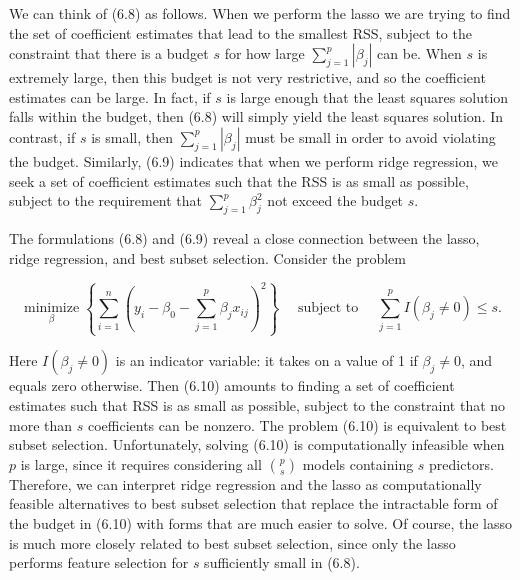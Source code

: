 \documentclass[10pt]{article}
\begin{document}
We can think of (6.8) as follows. When we perform the lasso we are trying to find the set of coefficient estimates that lead to the smallest RSS, subject to the constraint that there is a budget $s$ for how large $\sum_{j=1}^{p}\left|\beta_{j}\right|$ can be. When $s$ is extremely large, then this budget is not very restrictive, and so the coefficient estimates can be large. In fact, if $s$ is large enough that the least squares solution falls within the budget, then (6.8) will simply yield the least squares solution. In contrast, if $s$ is small, then $\sum_{j=1}^{p}\left|\beta_{j}\right|$ must be small in order to avoid violating the budget. Similarly, (6.9) indicates that when we perform ridge regression, we seek a set of coefficient estimates such that the RSS is as small as possible, subject to the requirement that $\sum_{j=1}^{p} \beta_{j}^{2}$ not exceed the budget $s$.

The formulations (6.8) and (6.9) reveal a close connection between the lasso, ridge regression, and best subset selection. Consider the problem


\begin{equation*}
\underset{\beta}{\operatorname{minimize}}\left\{\sum_{i=1}^{n}\left(y_{i}-\beta_{0}-\sum_{j=1}^{p} \beta_{j} x_{i j}\right)^{2}\right\} \quad \text { subject to } \quad \sum_{j=1}^{p} I\left(\beta_{j} \neq 0\right) \leq s . \tag{6.10}
\end{equation*}


Here $I\left(\beta_{j} \neq 0\right)$ is an indicator variable: it takes on a value of 1 if $\beta_{j} \neq 0$, and equals zero otherwise. Then (6.10) amounts to finding a set of coefficient estimates such that RSS is as small as possible, subject to the constraint that no more than $s$ coefficients can be nonzero. The problem (6.10) is equivalent to best subset selection. Unfortunately, solving (6.10) is computationally infeasible when $p$ is large, since it requires considering all $\binom{p}{s}$ models containing $s$ predictors. Therefore, we can interpret ridge regression and the lasso as computationally feasible alternatives to best subset selection that replace the intractable form of the budget in (6.10) with forms that are much easier to solve. Of course, the lasso is much more closely related to best subset selection, since only the lasso performs feature selection for $s$ sufficiently small in (6.8).
\end{document}
